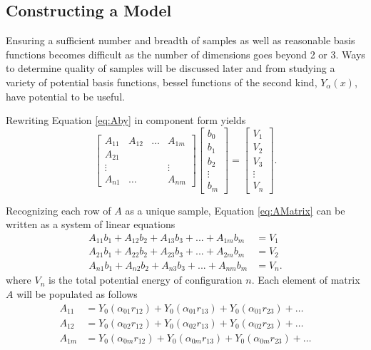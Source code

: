 \subsection{Constructing a Model}\label{Sect:LJModels}
\par Ensuring a sufficient number and breadth of samples as well as reasonable basis functions becomes difficult as the number of dimensions goes beyond 2 or 3. Ways to determine quality of samples will be discussed later and from studying a variety of potential basis functions, bessel functions of the second kind, $Y_\alpha(x)$, have potential to be useful.
\par Rewriting Equation \ref{eq:Aby} in component form yields
\begin{equation}
\begin{bmatrix}
A_{11} & A_{12} & \ldots & A_{1m} \\
A_{21} \\
\vdots & & & \vdots\\
A_{n1} & \ldots & & A_{nm}
\end{bmatrix}
\begin{bmatrix}
b_0 \\
b_1 \\
b_2 \\
\vdots \\
b_m 
\end{bmatrix}
=
\begin{bmatrix}
V_1 \\
V_2 \\
V_3 \\ 
\vdots \\
V_n
\end{bmatrix}.
\label{eq:AMatrix}
\end{equation}
\par Recognizing each row of $A$ as a unique sample, Equation \ref{eq:AMatrix} can be written as a system of linear equations
\begin{align}
A_{11}b_1 + A_{12}b_2 + A_{13}b_3 + ... + A_{1m}b_m &= V_1 \nonumber \\
A_{21}b_1 + A_{22}b_2 + A_{23}b_3 + ... + A_{2m}b_m &= V_2 \nonumber \\
A_{n1}b_1 + A_{n2}b_2 + A_{n3}b_3 + ... + A_{nm}b_m &= V_n.
\end{align}
where $V_n$ is the total potential energy of configuration $n$. Each element of matrix $A$ will be populated as follows
\begin{align}
A_{11} &= Y_0(\alpha_{01} r_{12}) + Y_0(\alpha_{01} r_{13}) + Y_0(\alpha_{01} r_{23}) + \ldots \nonumber \\
A_{12} &= Y_0(\alpha_{02} r_{12}) + Y_0(\alpha_{02} r_{13}) + Y_0(\alpha_{02} r_{23}) + \ldots \nonumber \\
A_{1m} &= Y_0(\alpha_{0m} r_{12}) + Y_0(\alpha_{0m} r_{13}) + Y_0(\alpha_{0m} r_{23}) + \ldots
\end{align}

